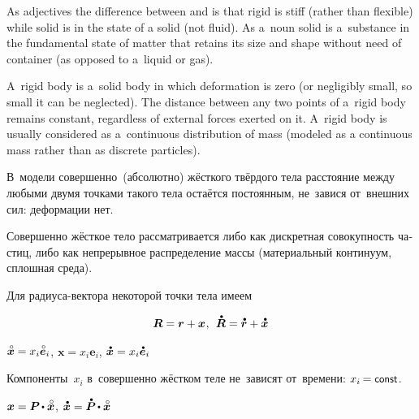 {\small
\noindent\leavevmode{\indent} As adjectives the difference between  and  is that rigid is stiff (rather than flexible) while solid is in the state of a solid (not fluid). As a~noun solid is a~substance in the fundamental state of matter that retains its size and shape without need of container (as opposed to a~liquid or gas).

\noindent\leavevmode{\indent} A~rigid body is a~solid body in which deformation is zero (or negligibly small, so small it can be neglected). The distance between any two points of a~rigid body remains constant, regardless of external forces exerted on it. A~rigid body is usually considered as a~continuous distribution of mass (modeled as a continuous mass rather than as discrete particles).
\par}

\foreignlanguage{russian}{В~модели совершенно~(абсолютно) жёсткого твёрдого тела расстояние между любыми двумя точками такого тела остаётся постоянным, не~завися от~внешних сил: деформации нет.}

\foreignlanguage{russian}{Совершенно жёсткое тело рассматривается либо как дискретная совокупность частиц, либо как непрерывное распределение массы (материальный континуум, сплошная среда).}

\foreignlanguage{russian}{Для радиуса\hbox{-}вектора некоторой точки тела имеем}

\begin{equation*}
\begin{array}{c}
\bm{R} = \bm{r} + \bm{x} \hspace{.1ex}, \:\:
\mathdotabove{\bm{R}} = \mathdotabove{\bm{r}} + \mathdotabove{\bm{x}}
\end{array}
\end{equation*}



${\mathcircabove{\bm{x}} = x_i \mathcircabove{\bm{e}}_i}$,
${\bm{x} = x_i \bm{e}_i}$,
${\mathdotabove{\bm{x}} = x_i \mathdotabove{\bm{e}}_i}$

\foreignlanguage{russian}{Компоненты~${x_i}$ в~совершенно жёстком теле не~зависят от~времени: ${x_i \hspace{-0.16ex} = \const}$.}

${\bm{x} = \bm{P} \hspace{-0.16ex} \dotp \mathcircabove{\bm{x}}}$,
${\mathdotabove{\bm{x}} = \mathdotabove{\bm{P}} \hspace{-0.16ex} \dotp \mathcircabove{\bm{x}}}$

